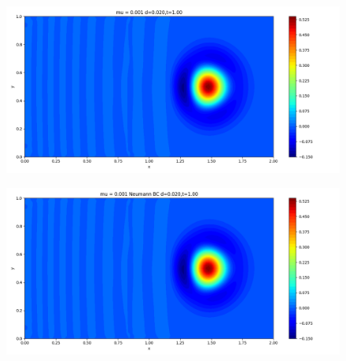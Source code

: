 \documentclass[12pt]{article}
\begin{document}
\begin{figure}[H]
\begin{minipage}{\linewidth}
    \begin{minipage}{0.5\textwidth}
    \includegraphics[width=\linewidth]{figuresmu/mu3d0.020t1.00.png}
    \label{fig5}
    \end{minipage}\hfill
    \begin{minipage}{0.5\textwidth}
    \includegraphics[width=\linewidth]{figuresmu/mu3Nud0.020t1.00.png}
    \label{fig6}
    \end{minipage}
    \vspace{-1.5em}
    

\end{minipage}
\end{figure}
\end{document}
